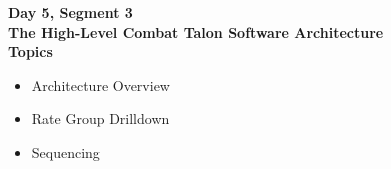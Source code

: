 \begin{frame}
\textbf{Day 5, Segment 3\\
The High-Level Combat Talon Software Architecture\\
Topics}
 \begin{itemize}
 \item Architecture Overview
 \item Rate Group Drilldown
 \item Sequencing
\end{itemize}
\end{frame}



% 

